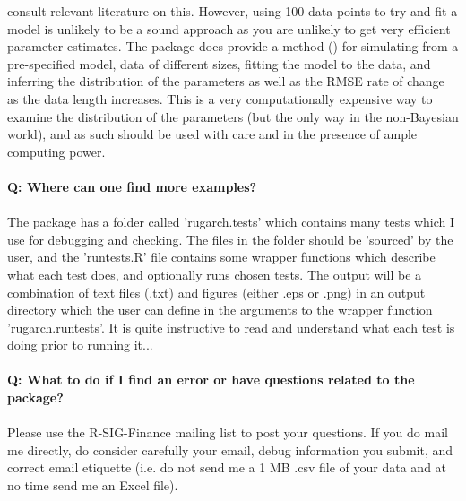consult relevant literature on this. However, using 100 data points to try and
fit a model is unlikely to be a sound approach as you are unlikely to get very
efficient parameter estimates. The \verb@rugarch@ package does provide a method
(\verb@ugarchdistribution@) for simulating from a pre-specified model, data of
different sizes, fitting the model to the data, and inferring the distribution
of the parameters as well as the RMSE rate of change as the data length
increases. This is a very computationally expensive way to examine the
distribution of the parameters (but the only way in the non-Bayesian world), and
as such should be used with care and in the presence of ample computing power.\\
\\
\textbf{Q: Where can one find more examples?}\\
\\
The package has a folder called 'rugarch.tests' which contains many tests
which I use for debugging and checking. The files in the folder should be
'sourced' by the user, and the 'runtests.R' file contains some wrapper functions
which describe what each test does, and optionally runs chosen tests. The
output will be a combination of text files (.txt) and figures (either .eps or
.png) in an output directory which the user can define in the arguments to the
wrapper function 'rugarch.runtests'. It is quite instructive to read and
understand what each test is doing prior to running it...\\
\\
\textbf{Q: What to do if I find an error or have questions related to the package?}\\
\\
Please use the R-SIG-Finance mailing list to post your questions. If you do mail
me directly, do consider carefully your email, debug information you submit, and
correct email etiquette (i.e. do not send me a 1 MB .csv file of your data and at
no time send me an Excel file).
